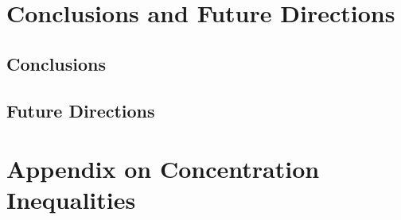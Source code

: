 \documentclass[MS,twoside]{iitmdiss}
\newcommand{\clearemptydoublepage}{\newpage{\cleardoublepage}}
\begin{document}

\clearemptydoublepage
\chapter{Conclusions and Future Directions}
\label{ThesisConc}

\section{Conclusions}


\section{Future Directions}



\appendix

\clearemptydoublepage
\chapter{Appendix on Concentration Inequalities}
\label{sec:app:Conc}



%


\begin{singlespace}


\end{singlespace}



\listofpapers

\end{document}
